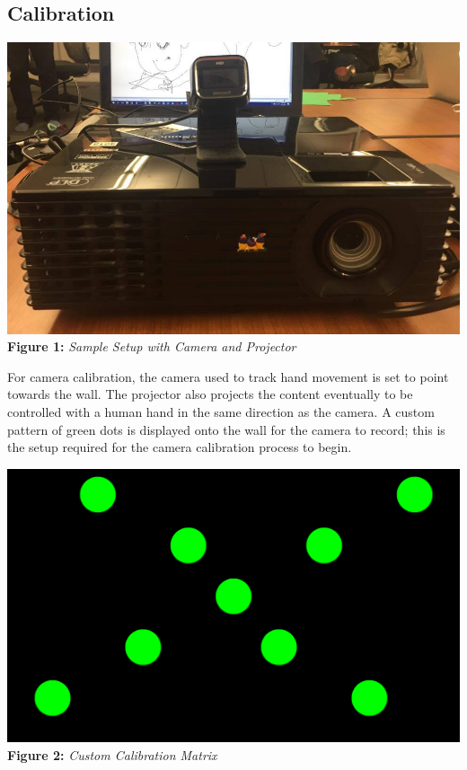 \documentclass[twoside,twocolumn]{article}
\begin{document}
\subsection{Calibration}

\begin{center}
	\includegraphics[scale=0.19]{setup} \\
	\vspace{0.25cm}
	\small{\textbf{Figure 1:} \textit{Sample Setup with Camera and Projector}}
\end{center}

For camera calibration, the camera used to track hand movement is set to point towards the wall. The projector also projects the content eventually to be controlled with a human hand in the same direction as the camera. A custom pattern of green dots is displayed onto the wall for the camera to record; this is the setup required for the camera calibration process to begin.

\begin{center}
	\includegraphics[scale=0.12]{calibrationMatrix} \\
	\vspace{0.1cm}
	\small{\textbf{Figure 2:} \textit{Custom Calibration Matrix}}
\end{center}
\end{document}
